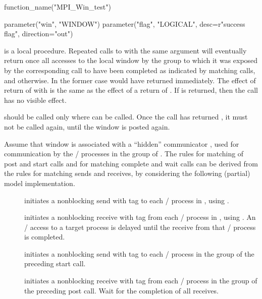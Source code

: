 %
\begin{mpi-binding}
    function_name("MPI_Win_test")
    
    parameter("win", "WINDOW")
    parameter("flag", "LOGICAL", desc=r"success flag", direction="out")
\end{mpi-binding}

 is a local procedure.
Repeated calls to  with the same  argument
will eventually return  once all accesses to the
local window by the group to which it was exposed by the corresponding call to
 have been completed as indicated by matching
 calls, and  otherwise.
In the former case 
would have returned immediately.
The effect of return of  with
 is the same as the effect of a return 
of .  If  is returned,
then the call has no visible effect.

 should be called only where
can be called.
Once the call has returned , it must not be
called again, until the window is posted again.

Assume that window  is associated with a ``hidden'' 
communicator , used for communication by the \mpi/ processes
in the group of .  The rules for matching of post and start calls and
for matching complete and wait calls can be
derived from the rules for 
matching sends and receives, by considering the following (partial) model
implementation. 

\begin{description}
\item[]
initiates a nonblocking send with tag  to each
\mpi/ process in , using .
\item[]
initiates a nonblocking receive with tag  from each \mpi/
process in , using .  An \RMA/ access to
a target process is delayed until the receive
from that \mpi/ process is completed.
\item[]
initiates a nonblocking send with tag  to each \mpi/ process in
the group of the preceding start call.
\item[]
initiates a nonblocking receive with tag  from each
\mpi/ process in the group of the preceding post call.  Wait for the
completion of all receives. 
\end{description}

